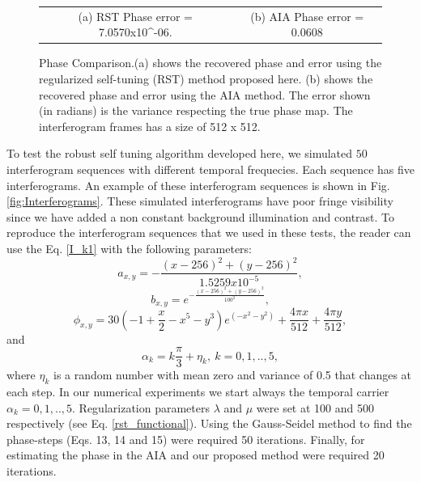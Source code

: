 \documentclass[letterpaper,12pt]{article}   %
\begin{document}
\begin{figure}[ t]
\begin{center}
\begin{tabular}{c c}
			(a) RST Phase error =  7.0570x10^{-06}. & (b) AIA Phase error =  0.0608
		\end{tabular}
	\end{center}
	\caption{Phase Comparison.(a) shows the recovered phase and error using the
	regularized self-tuning (RST) method proposed here. (b)  shows the recovered phase
	and error using the AIA method. The error shown (in radians) is the variance
	respecting the true phase map. The interferogram frames has a size of 512 x 512.}
	\label{fig:phase}
\end{figure}

To test the robust self tuning algorithm developed here, we simulated $50$ interferogram
sequences with different temporal frequecies. Each sequence has five interferograms. An
example of these interferogram sequences is shown in Fig.\ref{fig:Interferograms}. These
simulated interferograms have poor fringe visibility since we have added a non constant
background illumination and contrast.  To reproduce the interferogram sequences that we
used in these tests, the reader can use the Eq. \ref{I_k1} with the following parameters:
\begin{equation}
	a_{x,y}=-\frac{(x-256)^2+(y-256)^2}{1.5259x10^{-5}},
\end{equation}
\begin{equation}
	b_{x,y}=e^{-\frac{(x-256)^2+(y-256)^2}{100^{2}}},
\end{equation}
\begin{equation}
	\phi_{x,y}= 30(-1+\frac{x}{2}-x^5-y^3) e^{(-x^2-y^2)}+\frac{4\pi x}{512}+\frac{4\pi
	 y}{512},
\end{equation}
and
\begin{equation}
	\alpha_k = k\frac{\pi}{3}+\eta_k,\: k=0,1,..,5,
\end{equation}
where $\eta_k$ is a random number with mean zero and variance of 0.5 that changes at 
each step.
In our numerical experiments we start always the temporal carrier $\alpha_k=0,1,..,5$.
Regularization parameters $\lambda$ and $\mu$ were set at 100 and 500 respectively (see 
Eq. \ref{rst_functional}). Using the Gauss-Seidel method to find the phase-steps (Eqs. 
13, 14 and 15) were required 50 iterations. Finally, for estimating the phase in the AIA 
and our proposed method were required 20 iterations.
\end{document}
